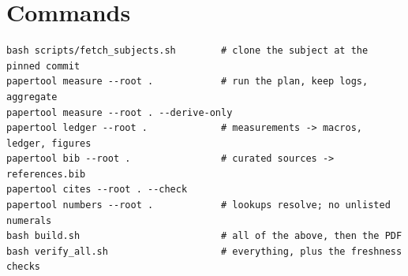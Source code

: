 \documentclass[11pt,a4paper]{article}
\begin{document}



\appendix
\section{Commands}

\begin{verbatim}
bash scripts/fetch_subjects.sh        # clone the subject at the pinned commit
papertool measure --root .            # run the plan, keep logs, aggregate
papertool measure --root . --derive-only
papertool ledger --root .             # measurements -> macros, ledger, figures
papertool bib --root .                # curated sources -> references.bib
papertool cites --root . --check
papertool numbers --root .            # lookups resolve; no unlisted numerals
bash build.sh                         # all of the above, then the PDF
bash verify_all.sh                    # everything, plus the freshness checks\end{verbatim}
\end{document}
